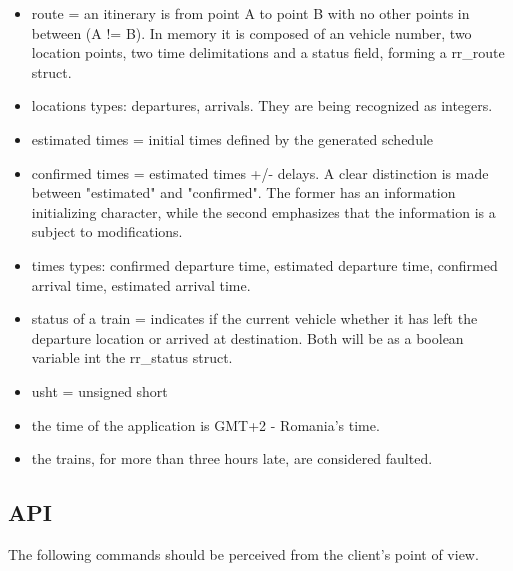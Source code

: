 \documentclass[runningheads]{llncs}
\begin{document}
\begin{itemize}
  \item route = an itinerary is from point A to point B with no other points in between (A != B). In memory it is composed of an vehicle number, two location points, two time delimitations and a status field, forming a rr\_route struct.

  \item locations types: departures, arrivals. They are being recognized as integers.

  \item estimated times = initial times defined by the generated schedule
  \item confirmed times = estimated times +/- delays. A clear distinction is made between "estimated" and "confirmed". The former has an information initializing character, while the second emphasizes that the information is a subject to modifications.
    
  \item times types: confirmed departure time, estimated departure time, confirmed arrival time, estimated arrival time.
    
  \item status of a train = indicates if the current vehicle whether it has left the departure location or arrived at destination. Both will be as a boolean variable int the rr\_status struct.

  \item usht = unsigned short
  \item the time of the application is GMT+2 - Romania's time. 
  \item the trains, for more than three hours late, are considered faulted.
\end{itemize}

\subsection{API}

The following commands should be perceived from the client's point of view.
\end{document}
